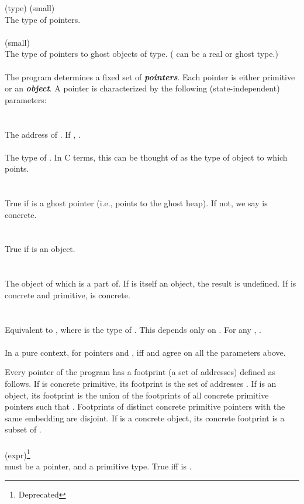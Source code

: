 \documentclass[preprint,nocopyrightspace]{sigplanconf}
\newcommand{\Def}[1]{\textit{\textbf{#1}}}
\begin{document}
{{\vcc{\object} (type) (small)\\
The type of pointers.
\\\\
 (small)\\
The type of pointers to ghost objects of type. ( can be a real or ghost type.)
\\\\
The program determines a fixed set of \Def{pointers}.  Each
pointer is either primitive or an \Def{object}. 
A pointer is characterized by the following (state-independent) parameters:
\\\\
\\
The address of . If , 
.
\\\
\\
The type of . In C terms, this can be thought of as the type of
object to which \vcc{p} points.
\\\\
\\
True if  is a ghost pointer (i.e., points to the ghost
heap). If not, we say  is concrete. 
\\\\
\\
True if \vcc{p} is an object. 
\\\\
\\
The object of which  is a part of. If  is itself an object, the
result is undefined. If \vcc{p} is concrete and
primitive,  is concrete.
\\\\
\\
Equivalent to , where  is the type
of . This depends only on . For any , 
\vcc{\sizeof_opject(p) > 0}.
\\\\
In a pure context, for pointers  and , 
iff \vcc{p} and \vcc{q} agree on all the parameters above.

Every pointer of the program has a footprint (a set of addresses)
defined as follows.  If \vcc{p} is concrete primitive, its footprint
is the set of addresses
\vcc{[\addr(p),\addr(p) + \sizeof_object(p))}.
If  is an object, its footprint is the union of
the footprints of all concrete primitive pointers 
 such that . 
Footprints of distinct concrete primitive pointers with the same
embedding are disjoint.  If \vcc{p} is a concrete object, its concrete
footprint is a subset of 
\vcc{[\addr(p),\addr(p) + \sizeof_object(p))}.
\\\\
 (expr)\footnote{Deprecated}\\
 must be a pointer, and  a primitive type. 
True iff  is \vcc{T}.

}}
\end{document}
